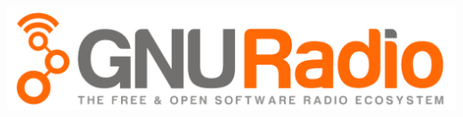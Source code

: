 \documentclass[11pt]{article}
\begin{document}
\includegraphics[width=0.9\linewidth]{gnuradio_logo_web}
\begin{multicols}{3}

\end{multicols}
 
\end{document}
